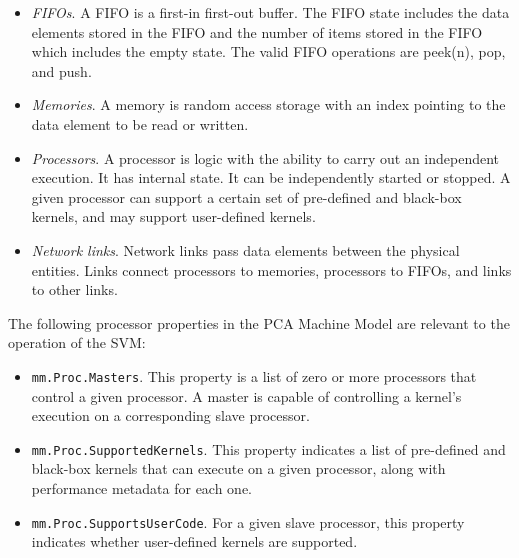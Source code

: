 \begin{itemize}

\item {\it FIFOs}.  A FIFO is a first-in first-out buffer.  The FIFO
state includes the data elements stored in the FIFO and the number of
items stored in the FIFO which includes the empty state.  The valid
FIFO operations are peek(n), pop, and push.

\item {\it Memories}. A memory is random access storage with an index
pointing to the data element to be read or written.

\item {\it Processors}. A processor is logic with the ability to carry
out an independent execution.  It has internal state.  It can be
independently started or stopped.  A given processor can support a
certain set of pre-defined and black-box kernels, and may support
user-defined kernels.

\item {\it Network links}. Network links pass data elements between
the physical entities.  Links connect processors to memories,
processors to FIFOs, and links to other links.

\end{itemize}


The following processor properties in the PCA Machine Model are
relevant to the operation of the SVM:

\begin{itemize}

\item {\tt mm.Proc.Masters}.  This property is a list of zero or more
processors that control a given processor.  A master is capable of
controlling a kernel's execution on a corresponding slave processor.


\item {\tt mm.Proc.SupportedKernels}.  This property indicates a list
of pre-defined and black-box kernels that can execute on a given
processor, along with performance metadata for each one.

\item {\tt mm.Proc.SupportsUserCode}.  For a given slave processor,
this property indicates whether user-defined kernels are supported.

\end{itemize}

